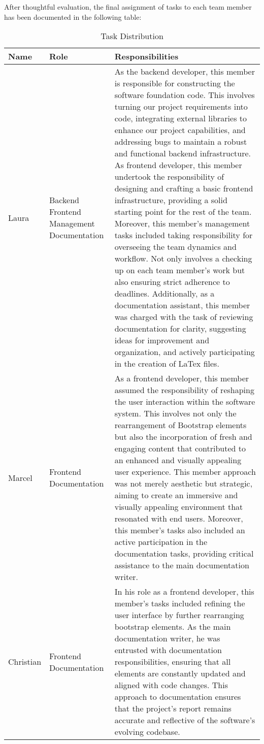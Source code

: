 \documentclass[conference]{IEEEtran}
\begin{document}
After thoughtful evaluation, the final assignment of tasks to each team member has been documented in the following table:
\begin{table}[H]
\centering
\begin{tabular}{| p{1cm}|p{1.5cm}|p{5cm} |}
\hline
\textbf{Name} & \textbf{Role} & \textbf{Responsibilities}\\
\hline
Laura & Backend Frontend Management Documentation & 
As the backend developer, this member is responsible for constructing the software foundation code. This involves turning our project requirements into code, integrating external libraries to enhance our project capabilities, and addressing bugs to maintain a robust and functional backend infrastructure.
As frontend developer, this member undertook the responsibility of designing and crafting a basic frontend infrastructure, providing a solid starting point for the rest of the team.
Moreover, this member’s management tasks included taking responsibility for overseeing the team dynamics and workflow. Not only involves a checking up on each team member’s work but also ensuring strict adherence to deadlines.
Additionally, as a documentation assistant, this member was charged with the task of reviewing documentation for clarity, suggesting ideas for improvement and organization, and actively participating in the creation of LaTex files.\\
\hline
Marcel & Frontend Documentation & 
As a frontend developer, this member assumed the responsibility of reshaping the user interaction within the software system. This involves not only the rearrangement of Bootstrap elements but also the incorporation of fresh and engaging content that contributed to an enhanced and visually appealing user experience. This member approach was not merely aesthetic but strategic, aiming to create an immersive and visually appealing environment that resonated with end users.
Moreover, this member’s tasks also included an active participation in the documentation tasks, providing critical assistance to the main documentation writer.\\
\hline
Christian & Frontend Documentation & 
In his role as a frontend developer, this member’s tasks included refining the user interface by further rearranging bootstrap elements.
As the main documentation writer, he was entrusted with documentation responsibilities, ensuring that all elements are constantly updated and aligned with code changes. This approach to documentation ensures that the project’s report remains accurate and reflective of the software’s evolving codebase.\\
\hline
\end{tabular}
\caption{Task Distribution}
\label{tab3}
\end{table}
\end{document}
